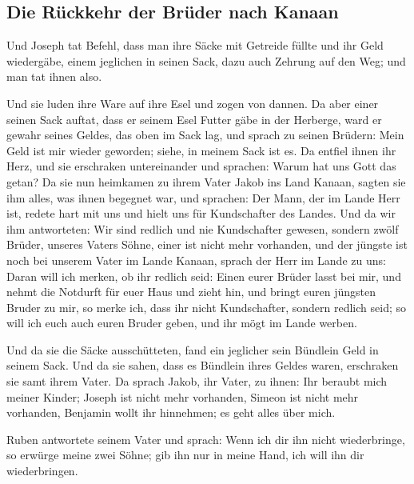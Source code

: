 \hypertarget{die-ruxfcckkehr-der-bruxfcder-nach-kanaan}{%
\subsection{Die Rückkehr der Brüder nach
Kanaan}\label{die-ruxfcckkehr-der-bruxfcder-nach-kanaan}}

 Und Joseph tat Befehl, dass man ihre Säcke mit Getreide
füllte und ihr Geld wiedergäbe, einem jeglichen in seinen Sack, dazu
auch Zehrung auf den Weg; und man tat ihnen also.

 Und sie luden ihre Ware auf ihre Esel und zogen von
dannen.  Da aber einer seinen Sack auftat, dass er seinem
Esel Futter gäbe in der Herberge, ward er gewahr seines Geldes, das oben
im Sack lag,  und sprach zu seinen Brüdern: Mein Geld ist
mir wieder geworden; siehe, in meinem Sack ist es. Da entfiel ihnen ihr
Herz, und sie erschraken untereinander und sprachen: Warum hat uns Gott
das getan?  Da sie nun heimkamen zu ihrem Vater Jakob ins
Land Kanaan, sagten sie ihm alles, was ihnen begegnet war, und sprachen:
 Der Mann, der im Lande Herr ist, redete hart mit uns und
hielt uns für Kundschafter des Landes.  Und da wir ihm
antworteten: Wir sind redlich und nie Kundschafter gewesen,
 sondern zwölf Brüder, unseres Vaters Söhne, einer ist
nicht mehr vorhanden, und der jüngste ist noch bei unserem Vater im
Lande Kanaan,  sprach der Herr im Lande zu uns: Daran
will ich merken, ob ihr redlich seid: Einen eurer Brüder lasst bei mir,
und nehmt die Notdurft für euer Haus und zieht hin,  und
bringt euren jüngsten Bruder zu mir, so merke ich, dass ihr nicht
Kundschafter, sondern redlich seid; so will ich euch auch euren Bruder
geben, und ihr mögt im Lande werben.

 Und da sie die Säcke ausschütteten, fand ein jeglicher
sein Bündlein Geld in seinem Sack. Und da sie sahen, dass es Bündlein
ihres Geldes waren, erschraken sie samt ihrem Vater.  Da
sprach Jakob, ihr Vater, zu ihnen: Ihr beraubt mich meiner Kinder;
Joseph ist nicht mehr vorhanden, Simeon ist nicht mehr vorhanden,
Benjamin wollt ihr hinnehmen; es geht alles über mich.

 Ruben antwortete seinem Vater und sprach: Wenn ich dir
ihn nicht wiederbringe, so erwürge meine zwei Söhne; gib ihn nur in
meine Hand, ich will ihn dir wiederbringen.

